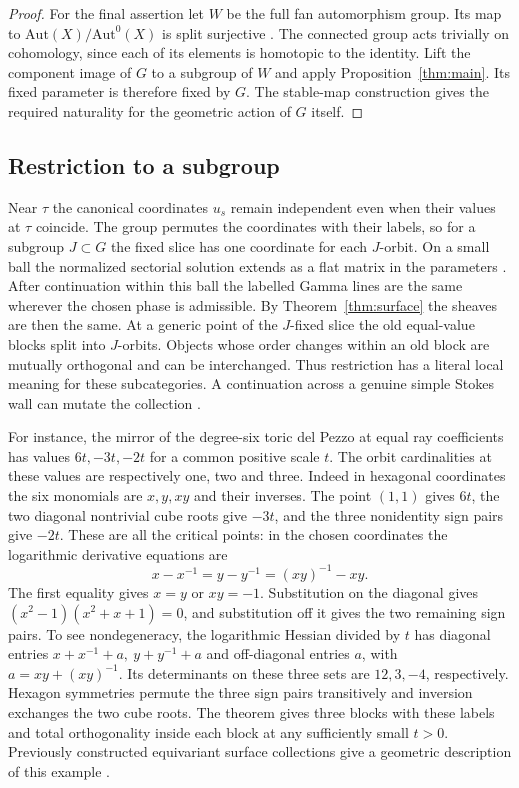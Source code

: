 \begin{proof}
For the final assertion let $W$ be the full fan automorphism group. Its map to $\mathrm{Aut}(X)/\mathrm{Aut}^0(X)$ is split surjective \cite[Theorem~4.5]{Dun}. The connected group acts trivially on cohomology, since each of its elements is homotopic to the identity. Lift the component image of $G$ to a subgroup of $W$ and apply Proposition~\ref{thm:main}. Its fixed parameter is therefore fixed by $G$. The stable-map construction gives the required naturality for the geometric action of $G$ itself.
\end{proof}

\subsection{Restriction to a subgroup}
Near $\tau$ the canonical coordinates $u_s$ remain independent even when their values at $\tau$ coincide. The group permutes the coordinates with their labels, so for a subgroup $J\subset G$ the fixed slice has one coordinate for each $J$-orbit. On a small ball the normalized sectorial solution extends as a flat matrix in the parameters \cite[Proposition~2.5.1]{GGI}. After continuation within this ball the labelled Gamma lines are the same wherever the chosen phase is admissible. By Theorem~\ref{thm:surface} the sheaves are then the same. At a generic point of the $J$-fixed slice the old equal-value blocks split into $J$-orbits. Objects whose order changes within an old block are mutually orthogonal and can be interchanged. Thus restriction has a literal local meaning for these subcategories. A continuation across a genuine simple Stokes wall can mutate the collection \cite[\S4.6]{GGI}.

For instance, the mirror of the degree-six toric del Pezzo at equal ray coefficients has values $6t,-3t,-2t$ for a common positive scale $t$. The orbit cardinalities at these values are respectively one, two and three. Indeed in hexagonal coordinates the six monomials are $x,y,xy$ and their inverses. The point $(1,1)$ gives $6t$, the two diagonal nontrivial cube roots give $-3t$, and the three nonidentity sign pairs give $-2t$. These are all the critical points: in the chosen coordinates the logarithmic derivative equations are
\[
 x-x^{-1}=y-y^{-1}= (xy)^{-1}-xy .
\]
The first equality gives $x=y$ or $xy=-1$. Substitution on the diagonal gives $(x^2-1)(x^2+x+1)=0$, and substitution off it gives the two remaining sign pairs. To see nondegeneracy, the logarithmic Hessian divided by $t$ has diagonal entries $x+x^{-1}+a,\ y+y^{-1}+a$ and off-diagonal entries $a$, with $a=xy+(xy)^{-1}$. Its determinants on these three sets are $12,3,-4$, respectively. Hexagon symmetries permute the three sign pairs transitively and inversion exchanges the two cube roots. The theorem gives three blocks with these labels and total orthogonality inside each block at any sufficiently small $t>0$. Previously constructed equivariant surface collections give a geometric description of this example \cite{BDM,ESS}.

